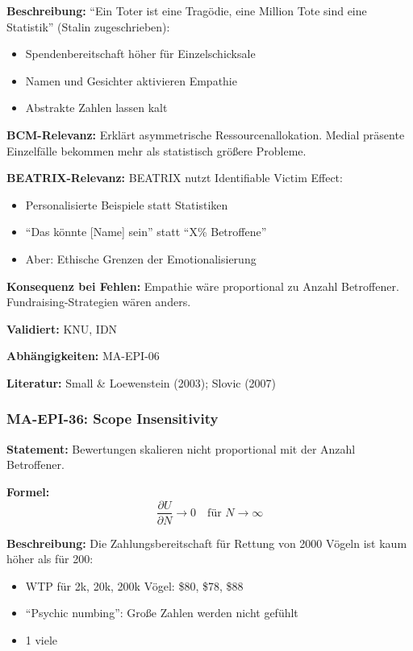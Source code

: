 \textbf{Beschreibung:}
``Ein Toter ist eine Tragödie, eine Million Tote sind eine Statistik'' (Stalin zugeschrieben):
\begin{itemize}
    \item Spendenbereitschaft höher für Einzelschicksale
    \item Namen und Gesichter aktivieren Empathie
    \item Abstrakte Zahlen lassen kalt
\end{itemize}

\textbf{BCM-Relevanz:}
Erklärt asymmetrische Ressourcenallokation. Medial präsente Einzelfälle bekommen mehr als statistisch größere Probleme.

\textbf{BEATRIX-Relevanz:}
BEATRIX nutzt Identifiable Victim Effect:
\begin{itemize}
    \item Personalisierte Beispiele statt Statistiken
    \item ``Das könnte [Name] sein'' statt ``X\% Betroffene''
    \item Aber: Ethische Grenzen der Emotionalisierung
\end{itemize}

\textbf{Konsequenz bei Fehlen:}
Empathie wäre proportional zu Anzahl Betroffener. Fundraising-Strategien wären anders.

\textbf{Validiert:} KNU, IDN

\textbf{Abhängigkeiten:} MA-EPI-06

\textbf{Literatur:} Small \& Loewenstein (2003); Slovic (2007)


\subsubsection*{MA-EPI-36: Scope Insensitivity}

\textbf{Statement:} Bewertungen skalieren nicht proportional mit der Anzahl Betroffener.

\textbf{Formel:}
\begin{equation}
\frac{\partial U}{\partial N} \rightarrow 0 \quad \text{für } N \rightarrow \infty
\end{equation}

\textbf{Beschreibung:}
Die Zahlungsbereitschaft für Rettung von 2000 Vögeln ist kaum höher als für 200:
\begin{itemize}
    \item WTP für 2k, 20k, 200k Vögel: \$80, \$78, \$88
    \item ``Psychic numbing'': Große Zahlen werden nicht gefühlt
    \item 1  \approx viele
\end{itemize}

